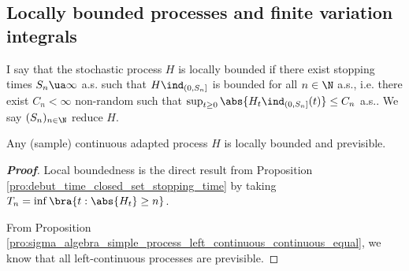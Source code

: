\subsection{Locally bounded processes and finite variation integrals}

\begin{definition}\label{def:locally_bounded_stochastic_process}%
I say that the stochastic process $H$ is locally bounded if there exist stopping times $S_n \ua \infty$ a.s. such that $H \ind_{(0,S_n]}$ is bounded for all $n \in \N$ a.s., i.e. there exist $C_n < \infty$ non-random such that $\sup_{t\geq0} \abs{H_t \ind_{(0,S_n]}(t)} \leq C_n$ a.s.. We say $(S_n)_{n\in \N}$ reduce $H$.
\end{definition}


\begin{proposition}\label{pro:continuous_adapted_process_is_locally_bounded_previsible}
Any (sample) continuous adapted process $H$ is locally bounded and previsible.
\end{proposition}

\begin{proof}[\bf Proof]
Local boundedness is the direct result from Proposition \ref{pro:debut_time_closed_set_stopping_time} by taking $T_n = \inf\bra{t:\abs{H_t}\geq n}$. %

From Proposition \ref{pro:sigma_algebra_simple_process_left_continuous_continuous_equal}, we know that all left-continuous processes are previsible.
\end{proof}





